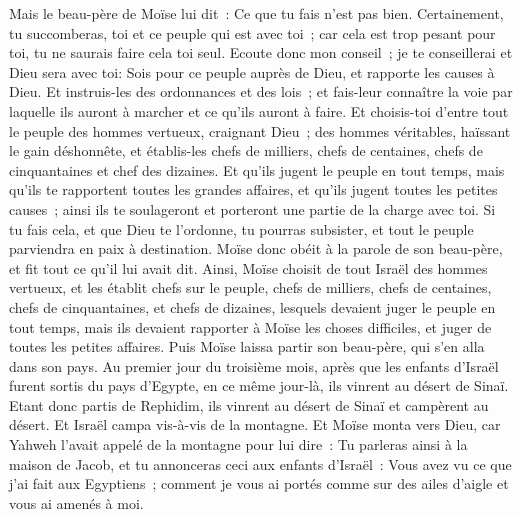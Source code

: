 \begin{multicols}{2}
Mais le beau-père de Moïse lui dit~: Ce que tu fais n'est pas bien.
Certainement, tu succomberas, toi et ce peuple qui est avec toi~; car cela est trop pesant pour toi, tu ne saurais faire cela toi seul.
Ecoute donc mon conseil~; je te conseillerai et Dieu sera avec toi: Sois pour ce peuple auprès de Dieu, et rapporte les causes à Dieu.
Et instruis-les des ordonnances et des lois~; et fais-leur connaître la voie par laquelle ils auront à marcher et ce qu'ils auront à faire.
Et choisis-toi d'entre tout le peuple des hommes vertueux, craignant Dieu~; des hommes véritables, haïssant le gain déshonnête, et établis-les chefs de milliers, chefs de centaines, chefs de cinquantaines et chef des dizaines.
Et qu'ils jugent le peuple en tout temps, mais qu'ils te rapportent toutes les grandes affaires, et qu'ils jugent toutes les petites causes~; ainsi ils te soulageront et porteront une partie de la charge avec toi.
Si tu fais cela, et que Dieu te l'ordonne, tu pourras subsister, et tout le peuple parviendra en paix à destination.
Moïse donc obéit à la parole de son beau-père, et fit tout ce qu'il lui avait dit.
Ainsi, Moïse choisit de tout Israël des hommes vertueux, et les établit chefs sur le peuple, chefs de milliers, chefs de centaines, chefs de cinquantaines, et chefs de dizaines,
lesquels devaient juger le peuple en tout temps, mais ils devaient rapporter à Moïse les choses difficiles, et juger de toutes les petites affaires.
Puis Moïse laissa partir son beau-père, qui s'en alla dans son pays.
\VerseOne{}Au premier jour du troisième mois, après que les enfants d'Israël furent sortis du pays d'Egypte, en ce même jour-là, ils vinrent au désert de Sinaï.
Etant donc partis de Rephidim, ils vinrent au désert de Sinaï et campèrent au désert. Et Israël campa vis-à-vis de la montagne.
Et Moïse monta vers Dieu, car Yahweh l'avait appelé de la montagne pour lui dire~: Tu parleras ainsi à la maison de Jacob, et tu annonceras ceci aux enfants d'Israël~:
Vous avez vu ce que j'ai fait aux Egyptiens~; comment je vous ai portés comme sur des ailes d'aigle et vous ai amenés à moi.

\end{multicols}
